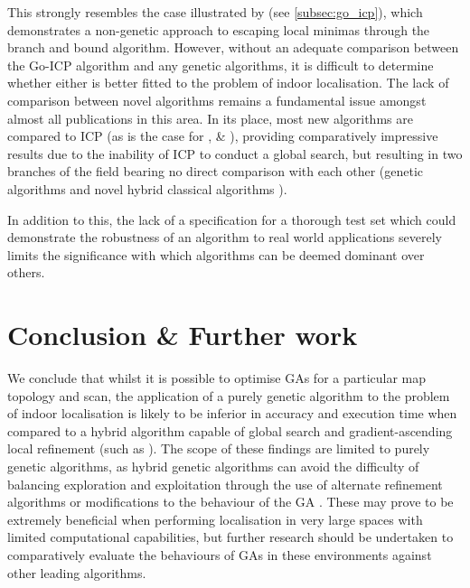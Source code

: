 \documentclass[authoryearcitations]{UoYCSproject}
\begin{document}
This strongly resembles the case illustrated by \citeauthor{Yang2013-gx} (see \autoref{subsec:go_icp}), which demonstrates a non-genetic approach to escaping local minimas through the branch and bound algorithm. However, without an adequate comparison between the Go-ICP algorithm and any genetic algorithms, it is difficult to determine whether either is better fitted to the problem of indoor localisation. The lack of comparison between novel algorithms remains a fundamental issue amongst almost all publications in this area. In its place, most new algorithms are compared to ICP (as is the case for \cite{Lenac2007-xm}, \cite{Lomonosov2006-vq} \& \cite{Yang2013-gx}), providing comparatively impressive results due to the inability of ICP to conduct a global search, but resulting in two branches of the field bearing no direct comparison with each other (genetic algorithms \cite{Lenac2007-xm} \cite{Lenac2011-co} \cite{Ze-Su2007-li} and novel hybrid classical algorithms \cite{Yang2013-gx} \cite{Ma2016-es}).  \newline

In addition to this, the lack of a specification for a thorough test set which could demonstrate the robustness of an algorithm to real world applications severely limits the significance with which algorithms can be deemed dominant over others. \newline

\chapter{Conclusion \& Further work}
\label{cha:conclusion}
We conclude that whilst it is possible to optimise GAs for a particular map topology and scan, the application of a purely genetic algorithm to the problem of indoor localisation is likely to be inferior in accuracy and execution time when compared to a hybrid algorithm capable of global search and gradient-ascending local refinement (such as \cite{Yang2013-gx}). The scope of these findings are limited to purely genetic algorithms, as hybrid genetic algorithms can avoid the difficulty of balancing exploration and exploitation through the use of alternate refinement algorithms \cite{Lenac2011-co} or modifications to the behaviour of the GA \cite{Chow2004-xc}. These may prove to be extremely beneficial when performing localisation in very large spaces with limited computational capabilities, but further research should be undertaken to comparatively evaluate the behaviours of GAs in these environments against other leading algorithms.\newline
\end{document}
